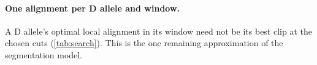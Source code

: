\documentclass[11pt,a4paper]{article}
\begin{document}
\paragraph{One alignment per D allele and window.} A D allele's optimal
local alignment in its window need not be its best clip at the chosen cuts
(\cref{tab:search}). This is the one remaining approximation of the
segmentation model.

\FloatBarrier


\end{document}
